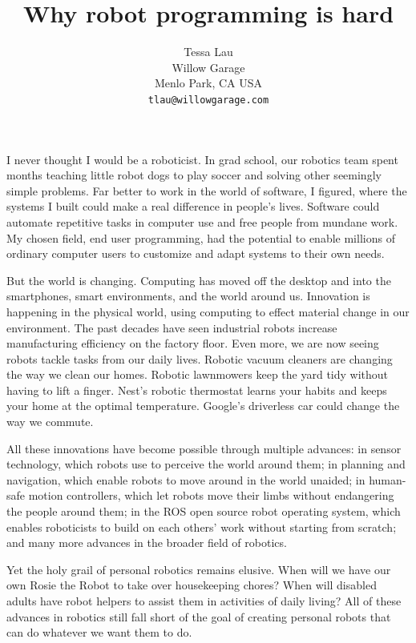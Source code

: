 \documentclass[11pt,twocolumn]{article}
\begin{document}
\title {Why robot programming is hard}
\author {Tessa Lau \\
Willow Garage \\
Menlo Park, CA USA \\
{\tt tlau@willowgarage.com}
}
\maketitle

I never thought I would be a roboticist. In grad school, our robotics team spent months teaching little robot dogs to play soccer and solving other seemingly simple problems. Far better to work in the world of software, I figured, where the systems I built could make a real difference in people's lives. Software could automate repetitive tasks in computer use and free people from mundane work. My chosen field, end user programming, had the potential to enable millions of ordinary computer users to customize and adapt systems to their own needs.

But the world is changing. Computing has moved off the desktop and into the smartphones, smart environments, and the world around us. Innovation is happening in the physical world, using computing to effect material change in our environment. The past decades have seen industrial robots increase manufacturing efficiency on the factory floor. Even more, we are now seeing robots tackle tasks from our daily lives. Robotic vacuum cleaners are changing the way we clean our homes. Robotic lawnmowers keep the yard tidy without having to lift a finger. Nest's robotic thermostat learns your habits and keeps your home at the optimal temperature. Google's driverless car could change the way we commute.

All these innovations have become possible through multiple advances: in sensor technology, which robots use to perceive the world around them; in planning and navigation, which enable robots to move around in the world unaided; in human-safe motion controllers, which let robots move their limbs without endangering the people around them; in the ROS open source robot operating system, which enables roboticists to build on each others' work without starting from scratch; and many more advances in the broader field of robotics.

Yet the holy grail of personal robotics remains elusive. When will we have our own Rosie the Robot to take over housekeeping chores? When will disabled adults have robot helpers to assist them in activities of daily living? All of these advances in robotics still fall short of the goal of creating personal robots that can do whatever we want them to do.
\end{document}
